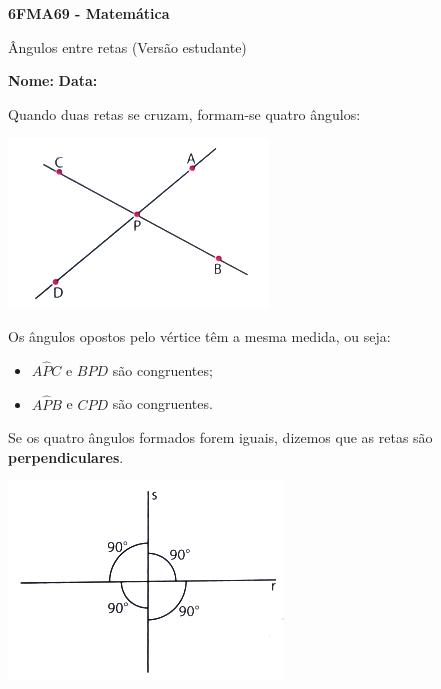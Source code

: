 \documentclass[a4paper,14pt]{article}
\begin{document}
	
	\noindent\textbf{6FMA69 - Matemática} 
	
	\begin{center}Ângulos entre retas (Versão estudante)
	\end{center}
	
	\noindent\textbf{Nome:} \underline{\hspace{10cm}}
	\noindent\textbf{Data:} \underline{\hspace{4cm}}
	
	
		\vspace{1cm}
		\noindent Quando duas retas se cruzam, formam-se quatro ângulos:
		\begin{center}
			\includegraphics[width=0.5\linewidth]{6FMA69_imagens/imagem1}
		\end{center}
		Os ângulos opostos pelo vértice têm a mesma medida, ou seja:
		\begin{itemize}
			\item $A\hat{P}C$ e $B\hat{P}D$ são congruentes;
			\item $A\hat{P}B$ e $C\hat{P}D$ são congruentes.
		\end{itemize}
		Se os quatro ângulos formados forem iguais, dizemos que as retas são \textbf{perpendiculares}.
		\begin{center}
			\includegraphics[width=0.5\linewidth]{6FMA69_imagens/imagem2}
		\end{center}
\end{document}
